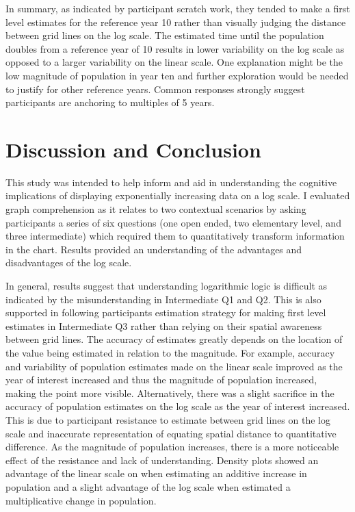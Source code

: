 \documentclass[print]{nuthesis}
\begin{document}
In summary, as indicated by participant scratch work, they tended to make a first level estimates for the reference year 10 rather than visually judging the distance between grid lines on the log scale.
The estimated time until the population doubles from a reference year of 10 results in lower variability on the log scale as opposed to a larger variability on the linear scale.
One explanation might be the low magnitude of population in year ten and further exploration would be needed to justify for other reference years.
Common responses strongly suggest participants are anchoring to multiples of 5 years.

\hypertarget{discussion-and-conclusion-2}{%
\section{Discussion and Conclusion}\label{discussion-and-conclusion-2}}

This study was intended to help inform and aid in understanding the cognitive implications of displaying exponentially increasing data on a log scale.
I evaluated graph comprehension as it relates to two contextual scenarios by asking participants a series of six questions (one open ended, two elementary level, and three intermediate) which required them to quantitatively transform information in the chart.
Results provided an understanding of the advantages and disadvantages of the log scale.

In general, results suggest that understanding logarithmic logic is difficult as indicated by the misunderstanding in Intermediate Q1 and Q2.
This is also supported in following participants estimation strategy for making first level estimates in Intermediate Q3 rather than relying on their spatial awareness between grid lines.
The accuracy of estimates greatly depends on the location of the value being estimated in relation to the magnitude.
For example, accuracy and variability of population estimates made on the linear scale improved as the year of interest increased and thus the magnitude of population increased, making the point more visible.
Alternatively, there was a slight sacrifice in the accuracy of population estimates on the log scale as the year of interest increased.
This is due to participant resistance to estimate between grid lines on the log scale and inaccurate representation of equating spatial distance to quantitative difference.
As the magnitude of population increases, there is a more noticeable effect of the resistance and lack of understanding.
Density plots showed an advantage of the linear scale on when estimating an additive increase in population and a slight advantage of the log scale when estimated a multiplicative change in population.
\end{document}
